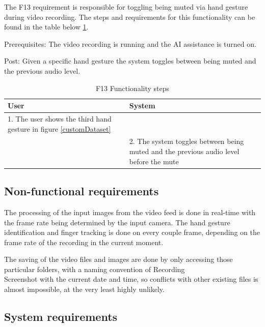 \par The F13 requirement is responsible for toggling being muted via hand gesture during video recording. The steps and requirements for this functionality can be found in the table below \ref{F13Table}.
\par Prerequisites: The video recording is running and the AI assistance is turned on.
\par Post: Given a specific hand gesture the system toggles between being muted and the previous audio level.

\begin{table}[htbp]
\begin{center}
\begin{tabular}
{|p{180pt}|p{180pt}|}
\hline
 User & System\\
\hline 
\hline 1. The user shows the third hand gesture in figure \ref{customDataset} &  \\
\hline  & 2. The system toggles between being muted and the previous audio level before the mute \\
\hline
\end{tabular}
\end{center}
\caption{F13 Functionality steps}
\label{F13Table}
\end{table}

\subsection{Non-functional requirements}
\label{sec:specssec1subsec2}

\par The processing of the input images from the video feed is done in real-time with the frame rate being determined by the input camera. The hand gesture identification and finger tracking is done on every couple frame, depending on the frame rate of the recording in the current moment.
\par The saving of the video files and images are done by only accessing those particular folders, with a naming convention of Recording\\Screenshot with the current date and time, so conflicts with other existing files is almost impossible, at the very least highly unlikely.

\subsection{System requirements}
\label{sec:specssec1subsec3}

